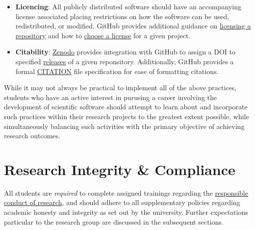 \documentclass[12pt,a4paper,article,oneside]{memoir} %
\begin{document}
\begin{itemize}
\item \textbf{Licencing}: All publicly distributed software should have an accompanying license associated placing restrictions on how the software can be used, redistributed, or modified. GitHub provides additional guidance on \href{https://docs.github.com/en/repositories/managing-your-repositorys-settings-and-features/customizing-your-repository/licensing-a-repository}{licensing a repository} and how to \href{https://choosealicense.com}{choose a license} for a given project.
\item \textbf{Citability}: \href{https://zenodo.org}{Zenodo} provides integration with GitHub to assign a DOI to specified \href{https://docs.github.com/en/repositories/releasing-projects-on-github/managing-releases-in-a-repository}{releases} of a given reponsitory. Additionally, GitHub provides a formal \href{https://docs.github.com/en/repositories/managing-your-repositorys-settings-and-features/customizing-your-repository/about-citation-files}{CITATION} file specification for ease of formatting citations.
\end{itemize}

While it may not always be practical to implement all of the above practices, students who have an active interest in purusing a career involving the development of scientific software should attempt to learn about and incorporate such practices within their research projects to the greatest extent possible, while simultaneously balancing such activities with the primary objective of achieving research outcomes.


\section{Research Integrity \& Compliance}


All students are \textit{required} to complete assigned trainings regarding the \href{https://research.okstate.edu/research-compliance/rcr/training.html}{responsible conduct of research}, and should adhere to all supplementary policies regarding academic honesty and integrity as set out by the university. Further expectations particular to the research group are discussed in the subsequent sections.
\end{document}
